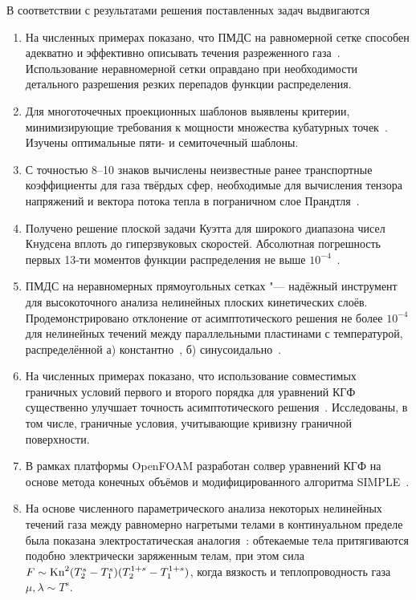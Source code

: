 В соответствии с результатами решения поставленных задач выдвигаются {}
\begin{enumerate}
    \item %
    На численных примерах показано, что ПМДС на равномерной сетке
    способен адекватно и эффективно описывать течения разреженного газа~\cite{Rogozin2010, Rogozin2011}.
    Использование неравномерной сетки оправдано при необходимости детального разрешения резких перепадов функции распределения.
    \item %
    Для многоточечных проекционных шаблонов выявлены критерии,
    минимизирующие требования к мощности множества кубатурных точек~\cite{Rogozin2016}.
    Изучены оптимальные пяти- и семиточечный шаблоны.
    \item %
    С точностью 8--10 знаков вычислены неизвестные ранее транспортные коэффициенты для газа твёрдых сфер,
    необходимые для вычисления тензора напряжений и вектора потока тепла в пограничном слое Прандтля~\cite{Rogozin2016}.
    \item %
    Получено решение плоской задачи Куэтта для широкого диапазона чисел Кнудсена вплоть до гиперзвуковых скоростей.
    Абсолютная погрешность первых 13-ти моментов функции распределения не выше \(10^{-4}\)~\cite{Rogozin2016}.
    \item %
    ПМДС на неравномерных прямоугольных сетках "--- надёжный инструмент для высокоточного анализа
    нелинейных плоских кинетических слоёв. Продемонстрировано отклонение от асимптотического
    решения не более \(10^{-4}\) для нелинейных течений между параллельными пластинами с температурой,
    распределённой а) константно~\cite{Rogozin2016}, б) синусоидально~\cite{Rogozin2017}.
    \item %
    На численных примерах показано, что использование совместимых граничных условий первого и второго порядка
    для уравнений КГФ существенно улучшает точность асимптотического решения~\cite{Rogozin2017}.
    Исследованы, в том числе, граничные условия, учитывающие кривизну граничной поверхности.
    \item %
    В рамках платформы OpenFOAM разработан солвер уравнений КГФ
    на основе метода конечных объёмов и модифицированного алгоритма SIMPLE~\cite{Rogozin2014}.
    \item %
    На основе численного параметрического анализа некоторых нелинейных течений газа
    между равномерно нагретыми телами в континуальном пределе была показана
    электростатическая аналогия~\cite{Rogozin2014}:
    обтекаемые тела притягиваются подобно электрически заряженным телам,
    при этом сила \(F\sim \mathrm{Kn}^2(T_2^s-T_1^s)(T_2^{1+s}-T_1^{1+s})\),
    когда вязкость и теплопроводность газа \(\mu, \lambda \sim T^s\).
\end{enumerate}

